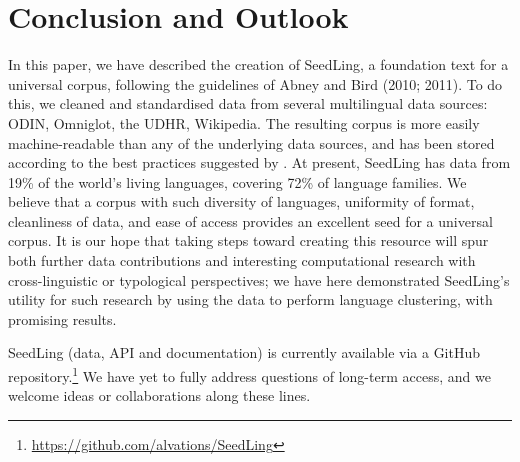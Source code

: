 \section{Conclusion and Outlook} \label{sec:conclusion}

In this paper, we have described the creation of SeedLing, a foundation text for a universal corpus, following the guidelines of Abney and Bird (2010; 2011). To do this, we cleaned and standardised data from several multilingual data sources: ODIN, Omniglot, the UDHR, Wikipedia. The resulting corpus is more easily machine-readable than any of the underlying data sources, and has been stored according to the best practices suggested by . At present, SeedLing has data from 19\% of the world's living languages, covering 72\% of language families. We believe that a corpus with such diversity of languages, uniformity of format, cleanliness of data, and ease of access provides an excellent seed for a universal corpus. It is our hope that taking steps toward creating this resource will spur both further data contributions and interesting computational research with cross-linguistic or typological perspectives; we have here demonstrated SeedLing's utility for such research by using the data to perform language clustering, with promising results.

SeedLing (data, API and documentation) is currently available via a GitHub repository.\footnote{\url{https://github.com/alvations/SeedLing}} We have yet to fully address questions of long-term access, and we welcome ideas or collaborations along these lines.
